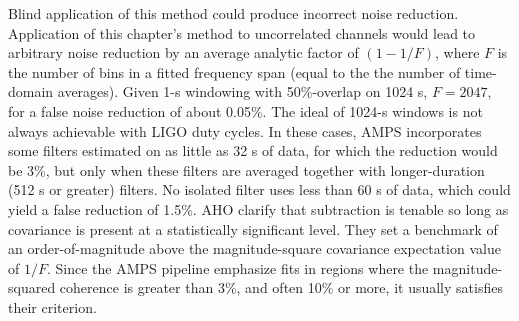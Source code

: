 Blind application of this method could produce incorrect noise reduction. 
Application of this chapter's method to uncorrelated channels would lead to arbitrary noise reduction by an average analytic factor of $(1 - 1/F)$, where $F$ is the number of bins in a fitted frequency span (equal to the the number of time-domain averages). 
Given 1-s windowing with 50\%-overlap on 1024 s, $F = 2047$, for a false noise reduction of about 0.05\%. 
The ideal of 1024-s windows is not always achievable with LIGO duty cycles. In these cases, AMPS incorporates some filters estimated on as little as 32 s of data, for which the reduction would be 3\%, but only when these filters are averaged together with longer-duration (512 s or greater) filters. No isolated filter uses less than 60 s of data, which could yield a false reduction of 1.5\%. AHO clarify that subtraction is tenable so long as covariance is present at a statistically significant level. They set a benchmark of an order-of-magnitude above the magnitude-square covariance expectation value of $1/F$. Since the AMPS pipeline emphasize fits in regions where the magnitude-squared coherence is greater than 3\%, and often 10\% or more, it usually satisfies their criterion.


